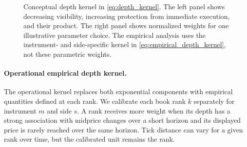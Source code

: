 \documentclass[11pt]{article}
\newenvironment{review}{\begingroup\color{blue}}{\endgroup}
\begin{document}
\begin{figure}[htbp]
{%
    }
    \caption{Conceptual depth kernel in \cref{eq:depth_kernel}. The left panel shows decreasing visibility, increasing
    protection from immediate execution, and their product. The right panel shows normalized weights for one illustrative
    parameter choice. The empirical analysis uses the instrument- and side-specific kernel in
    \cref{eq:empirical_depth_kernel}, not these parametric weights.}
    \label{fig:depth_kernel_behavior}
\end{figure}

\paragraph{Operational empirical depth kernel.}
The operational kernel replaces both exponential components with \begin{review}empirical quantities defined at each rank\end{review}. We calibrate each book
rank $k$ separately for instrument $m$ and side $s$. A rank receives more weight when its depth has \begin{review}a strong association with midprice changes over a short horizon\end{review} and its displayed price is rarely reached over the same horizon. Tick distance can vary
for a given rank over time, but the calibrated unit remains the rank.
\end{document}
